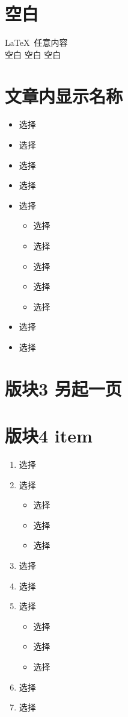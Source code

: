 \documentclass[a4paper,12pt,landscape]{book}
\begin{document}
	\endgroup
	\section*{空白}
	\LaTeX\
	任意内容 \\
	空白  空白      空白 \\[10pt]
	\nolinebreak
	
	\section[版块2 目录显示的名称]{文章内显示名称}
	\begin{itemize}
		\item 选择
		\item 选择
		\item 选择
		\item 选择
		\item 选择
		\begin{itemize}
			\item 选择
			\item 选择
			\item 选择
			\item 选择
			\item 选择
		\end{itemize}
			\item 选择
			\item 选择
	\end{itemize}
	
	\section{版块3 另起一页}
	\blindtext[2]
		
	\pagebreak
	\newpage
	
	
	\section{版块4 item}
	\begin{enumerate}[label=\arabic*.,font=\bfseries]
		\item 选择
		\item 选择
		\begin{itemize}
			\item 选择
			\item 选择
			\item 选择
		\end{itemize}
		\item 选择
		\item 选择
				\item 选择
		\begin{itemize}
			\item 选择
			\item 选择
			\item 选择
		\end{itemize}
		\item 选择
		\item 选择
	\end{enumerate}
\bigskip
\end{document}
